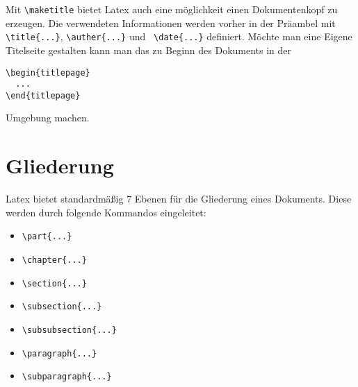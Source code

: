 Mit \verb+\maketitle+ bietet Latex auch eine möglichkeit einen Dokumentenkopf zu erzeugen. Die verwendeten
Informationen werden vorher in der Präambel mit \verb+\title{...}+, \verb+\auther{...}+ und
\verb+ \date{...}+ definiert. Möchte man eine Eigene Titelseite gestalten kann man das zu Beginn des Dokuments
in der 
\begin{verbatim}
\begin{titlepage}
  ...
\end{titlepage}
\end{verbatim}
Umgebung machen.

\section{Gliederung}
Latex bietet standardmäßig 7 Ebenen für die Gliederung eines Dokuments. Diese werden durch folgende Kommandos
eingeleitet:
\begin{itemize}
\item \verb+\part{...}+
\item \verb+\chapter{...}+
\item \verb+\section{...}+
\item \verb+\subsection{...}+
\item \verb+\subsubsection{...}+
\item \verb+\paragraph{...}+
\item \verb+\subparagraph{...}+        
\end{itemize}

